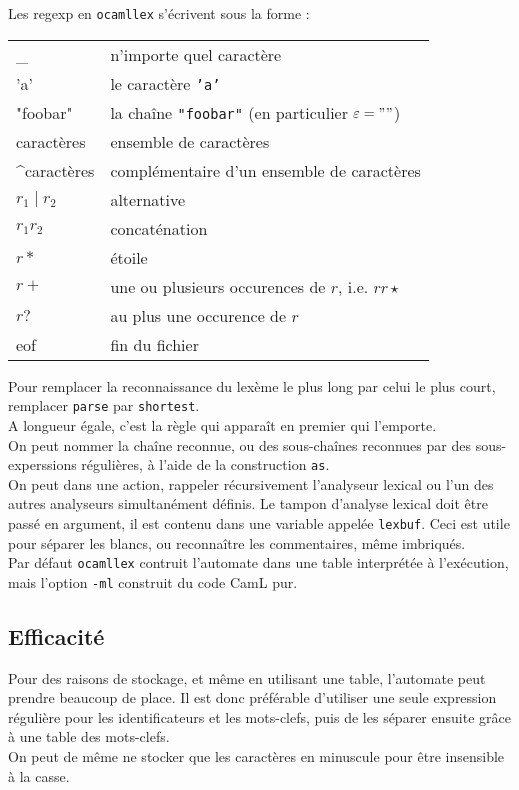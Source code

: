 \documentclass{cours}
\begin{document}
Les regexp en \texttt{ocamllex} s'écrivent sous la forme : 
\begin{center}
    \begin{tabular}{>{\texttt{}}ll}
        \toprule
        \_  & n'importe quel caractère\\
        'a' & le caractère \texttt{'a'}\\
        "foobar" & la chaîne \texttt{"foobar"} (en particulier $\epsilon = ""$)\\
        \text{[}caractères\text{]} & ensemble de caractères\\
        \text{[}\^{}caractères\text{]} & complémentaire d'un ensemble de caractères\\
        $r_{1} \mid r_{2}$ & alternative \\
        $r_{1}r_{2}$ & concaténation \\
        $r *$ & étoile\\
        $r + $ & une ou plusieurs occurences de $r$, i.e. $r r\star$\\
        $r?$ & au plus une occurence de $r$\\
        eof & fin du fichier\\
        \bottomrule         
    \end{tabular}
\end{center}
Pour remplacer la reconnaissance du lexème le plus long par celui le plus court, remplacer \texttt{parse} par \texttt{shortest}.\\
A longueur égale, c'est la règle qui apparaît en premier qui l'emporte. \\
On peut nommer la chaîne reconnue, ou des sous-chaînes reconnues par des sous-experssions régulières, à l'aide de la construction \texttt{as}.\\
On peut dans une action, rappeler récursivement l'analyseur lexical ou l'un des autres analyseurs simultanément définis. Le tampon d'analyse lexical doit être passé en argument, il est contenu dans une variable appelée \texttt{lexbuf}. Ceci est utile pour séparer les blancs, ou reconnaître les commentaires, même imbriqués. \\

Par défaut \texttt{ocamllex} contruit l'automate dans une table interprétée à l'exécution, mais l'option \texttt{-ml} construit du code CamL pur. 

\subsection{Efficacité}
Pour des raisons de stockage, et même en utilisant une table, l'automate peut prendre beaucoup de place. Il est donc préférable d'utiliser une seule expression régulière pour les identificateurs et les mots-clefs, puis de les séparer ensuite grâce à une table des mots-clefs.\\
On peut de même ne stocker que les caractères en minuscule pour être insensible à la casse.
\end{document}
